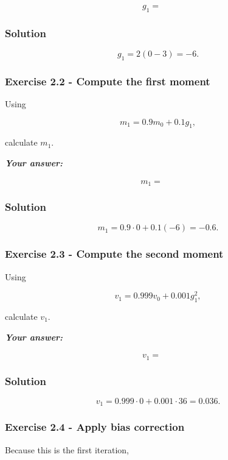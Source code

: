 \documentclass[10pt]{article}
\begin{document}
\[
g_1 = {\phantom{000}}
\]

\begingroup\color{red}

\subsubsection*{Solution}
\[
g_1=2(0-3)=-6.
\]

\par\endgroup

\subsubsection*{Exercise 2.2 - Compute the first moment}
Using

\[
m_1 = 0.9m_0 + 0.1g_1,
\]

calculate $m_1$.

\textbf{\textit{Your answer:}}

\[
m_1 = {\phantom{000}}
\]

\begingroup\color{red}

\subsubsection*{Solution}
\[
m_1=0.9\cdot0+0.1(-6)=-0.6.
\]

\par\endgroup

\subsubsection*{Exercise 2.3 - Compute the second moment}
Using

\[
v_1 = 0.999v_0 + 0.001g_1^2,
\]

calculate $v_1$.

\textbf{\textit{Your answer:}}

\[
v_1 = {\phantom{000}}
\]

\begingroup\color{red}

\subsubsection*{Solution}
\[
v_1=0.999\cdot0+0.001\cdot36=0.036.
\]

\par\endgroup

\subsubsection*{Exercise 2.4 - Apply bias correction}
Because this is the first iteration,
\end{document}
